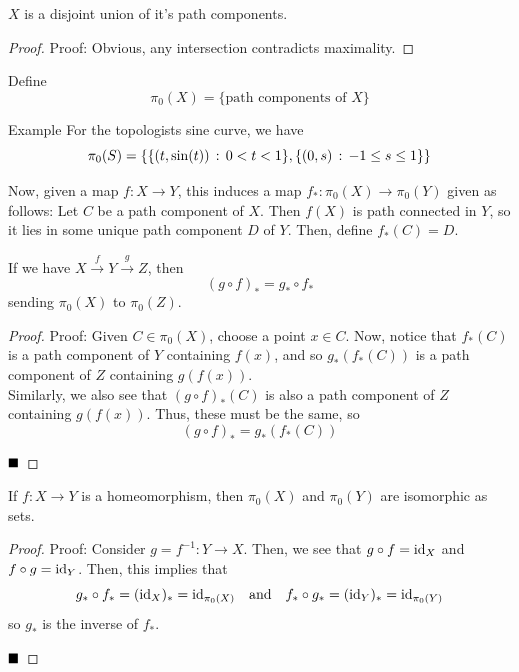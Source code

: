 \begin{lemma}
    $X$ is a disjoint union of it's path components.
\end{lemma}
\begin{proof}{Proof:}
    Obvious, any intersection contradicts maximality.
\end{proof}

\begin{definition}
    Define
    \[ \pi_{0}(X) = \{\text{path components of } X\} \]
\end{definition}

\begin{example}{Example}
    For the topologists sine curve, we have
    \[ \pi_{0}(S) = \{\{(t, \sin(t)) \, :\, 0 < t < 1\}, \{(0, s) \, :\, -1 \leq s \leq 1\}\} \]
\end{example}

Now, given a map $f : X \to Y$, this induces a map $f_{*} : \pi_0(X) \to \pi_{0}(Y)$ given as follows: Let $C$ be a path component of $X$. Then $f(X)$ is path connected in $Y$, so it lies in some unique path component $D$ of $Y$. Then, define $f_{*}(C) = D$. \\

\begin{lemma}
    If we have $X \overset{f}{\to} Y \overset{g}{\to} Z$, then
    \[ (g \circ f)_{*} = g_{*} \circ f_{*} \]
    sending $\pi_{0}(X)$ to $\pi_{0}(Z)$. 
\end{lemma}
\begin{proof}{Proof:}
    Given $C \in \pi_{0}(X)$, choose a point $x \in C$. Now, notice that $f_{*}(C)$ is a path component of $Y$ containing $f(x)$, and so $g_{*}(f_{*}(C))$ is a path component of $Z$ containing $g(f(x))$.\\

    Similarly, we also see that $(g \circ f)_{*}(C)$ is also a path component of $Z$ containing $g(f(x))$. Thus, these must be the same, so
    \[ (g \circ f)_{*} = g_{*}(f_{*}(C)) \]

    $\qed$
\end{proof}

\begin{lemma}
    If $f : X \to Y$ is a homeomorphism, then $\pi_{0}(X)$ and $\pi_{0}(Y)$ are isomorphic as sets. 
\end{lemma}
\begin{proof}{Proof:}
    Consider $g = f^{-1} : Y \to X$. Then, we see that $g \circ f = \text{id}_{X}$ and $f \circ g = \text{id}_{Y}$. Then, this implies that
    \[ g_{*} \circ f_{*} = (\text{id}_{X})_{*} = \text{id}_{\pi_0(X)} \quad \text{and} \quad f_{*} \circ g_{*} = (\text{id}_{Y})_{*} = \text{id}_{\pi_{0}(Y)} \]
    so $g_{*}$ is the inverse of $f_{*}$. 

    $\qed$
\end{proof}

